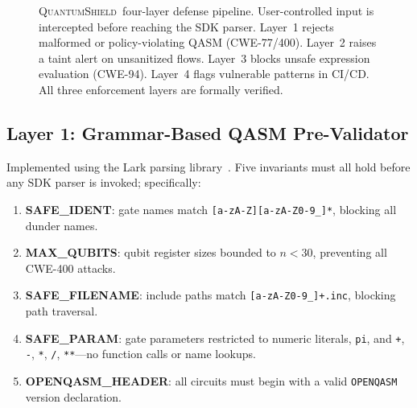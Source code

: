 \documentclass[conference,compsoc]{IEEEtran}
\newcommand{\tool}{\textsc{QuantumShield}}
\begin{document}
\begin{figure}[!ht]
{}
\caption{\tool\ four-layer defense pipeline. User-controlled input is
  intercepted before reaching the SDK parser. Layer~1 rejects
  malformed or policy-violating QASM (CWE-77/400). Layer~2 raises a
  taint alert on unsanitized flows. Layer~3 blocks unsafe
  expression evaluation (CWE-94). Layer~4 flags vulnerable patterns
  in CI/CD. All three enforcement layers are formally verified.}
\label{fig:architecture}
\end{figure}

\subsection{Layer 1: Grammar-Based QASM Pre-Validator}
\label{sec:layer1}
\noindent Implemented using the Lark parsing library~\cite{lark2022}.
Five invariants must all hold before any SDK parser is invoked; specifically:

\begin{enumerate}[leftmargin=*,topsep=2pt,itemsep=2pt]
  \item \textbf{SAFE\_IDENT}: gate names match
    \texttt{[a-zA-Z][a-zA-Z0-9\_]*}, blocking all dunder names.
  \item \textbf{MAX\_QUBITS}: qubit register sizes bounded to
    $n\!<\!30$, preventing all CWE-400 attacks.
  \item \textbf{SAFE\_FILENAME}: include paths match
    \texttt{[a-zA-Z0-9\_]+.inc}, blocking path traversal.
  \item \textbf{SAFE\_PARAM}: gate parameters restricted to numeric
    literals, \texttt{pi}, and \texttt{+}, \texttt{-}, \texttt{*},
    \texttt{/}, \texttt{**}---no function calls or name lookups.
  \item \textbf{OPENQASM\_HEADER}: all circuits must begin with a valid
    \texttt{OPENQASM} version declaration.
\end{enumerate}
\end{document}
